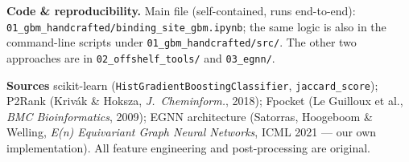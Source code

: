 \documentclass[12pt,a4paper,austrian]{article}
\begin{document}
\textbf{Code \& reproducibility.} Main file (self-contained, runs end-to-end):
\texttt{01\_gbm\_handcrafted/binding\_site\_gbm.ipynb}; the same logic is also in
the command-line scripts under \texttt{01\_gbm\_handcrafted/src/}. The other two
approaches are in \texttt{02\_offshelf\_tools/} and \texttt{03\_egnn/}.

\textbf{Sources} scikit-learn
(\texttt{HistGradientBoostingClassifier}, \texttt{jaccard\_score}); P2Rank
(Kriv\'ak \& Hoksza, \emph{J.\ Cheminform.}, 2018); Fpocket (Le Guilloux et al.,
\emph{BMC Bioinformatics}, 2009); EGNN architecture (Satorras, Hoogeboom \&
Welling, \emph{E(n) Equivariant Graph Neural Networks}, ICML 2021 --- our own
implementation). All feature engineering and post-processing are original.
\end{document}
